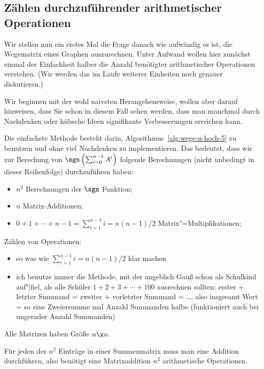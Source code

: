 \Tut\subsection{Z\"ahlen durchzuf\"uhrender arithmetischer Operationen}
\label{subsub:zaehlen}

Wir stellen nun ein erstes Mal die Frage danach wie aufwändig es ist,
die Wegematrix eines Graphen auszurechnen. Unter Aufwand wollen hier
zunächst einmal der Einfachheit halber die Anzahl benötigter
arithmetischer Operationen verstehen. (Wir werden das im Laufe
weiterer Einheiten noch genauer diskutieren.)

Wir beginnen mit der wohl naivsten Herangehensweise, wollen aber
darauf hinweisen, dass Sie schon in diesem Fall sehen werden, dass man
manchmal durch Nachdenken oder hübsche Ideen signifikante
Verbesserungen erreichen kann.

Die einfachste Methode besteht darin,
Algorithmus~\ref{alg:wege-n-hoch-5} zu benutzen und ohne viel
Nachdenken zu implementieren. Das bedeutet, dass wir zur Berechung von
$\sgn\left(\sum_{i=0}^{n-1} A^i\right)$ folgende Berechnungen (nicht
unbedingt in dieser Reihenfolge) durchzuführen haben:
\begin{itemize}
\item $n^2$ Berechnungen der $\sgn$ Funktion;
\item $n$ Matrix-Additionen;
\item $0+1+\cdots+n-1 = \sum_{i=1}^{n-1} i = n(n-1)/2$
  Matrix"=Multiplikationen;
\end{itemize}
% 
\begin{tutorium}
  Zählen von Operationen:
  \begin{itemize}
  \item so was wie $\sum_{i=1}^{n-1} i = n(n-1)/2$ klar machen
  \item ich benutze immer die Methode, mit der angeblich Gauß schon
    als Schulkind auf"|fiel, als alle Schüler $1+2+3+\cdots+100$
    ausrechnen sollten: erster + letzter Summand = zweiter +
    vorletzter Summand = \dots, also insgesamt Wert = so eine
    Zweiersumme mal Anzahl Summanden halbe (funktioniert auch bei
    ungerader Anzahl Summanden)
  \end{itemize}
\end{tutorium}
Alle Matrizen haben Größe $n\x n$.

Für jeden der $n^2$ Einträge in einer Summenmatrix muss man eine
Addition durchführen, also benötigt eine Matrixaddition $n^2$
arithmetische Operationen.

